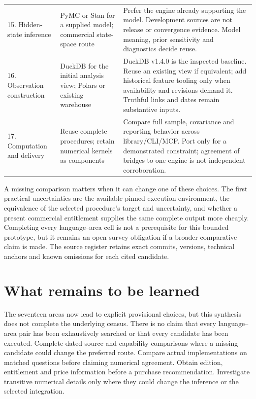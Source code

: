 \begin{longtable}{P{2.2cm}P{4.3cm}P{7.7cm}}
15. Hidden-state inference & PyMC or Stan for a supplied model; commercial state-space route & Prefer the engine already supporting the model. Development sources are not release or convergence evidence. Model meaning, prior sensitivity and diagnostics decide reuse. \citep{exec23_pymc_sources,exec25_bsw_stan,exec22_state_stata_sspace_post}\\[5pt]
16. Observation construction & DuckDB for the initial analysis view; Polars or existing warehouse & DuckDB v1.4.0 is the inspected baseline. Reuse an existing view if equivalent; add historical feature tooling only when availability and revisions demand it. Truthful links and dates remain substantive inputs. \citep{exec19_duckdb_source,exec23_polars_sources,exec19_feast_source}\\[5pt]
17. Computation and delivery & Reuse complete procedures; retain numerical kernels as components & Compare full sample, covariance and reporting behavior across library/CLI/MCP. Port only for a demonstrated constraint; agreement of bridges to one engine is not independent corroboration. \citep{exec25_paneljava_commons,exec25_panelcxx_fixest,exec25_panelother_julia}\\
\bottomrule
\end{longtable}
\endgroup

A missing comparison matters when it can change one of these choices. The
first practical uncertainties are the available pinned execution environment,
the equivalence of the selected procedure's target and uncertainty, and
whether a present commercial entitlement supplies the same complete output
more cheaply. Completing every language--area cell is not a prerequisite
for this bounded prototype, but it remains an open survey obligation if a
broader comparative claim is made. The source register retains exact commits,
versions, technical anchors and known omissions for each cited candidate.




\section{What remains to be learned}
The seventeen areas now lead to explicit provisional choices, but this synthesis
does not complete the underlying census. There is no claim that every
language--area pair has been exhaustively searched or that every candidate has
been executed. Complete dated source and capability comparisons where a missing
candidate could change the preferred route. Compare actual implementations on
matched questions before claiming numerical agreement. Obtain edition,
entitlement and price information before a purchase recommendation. Investigate
transitive numerical details only where they could change the inference or
the selected integration.

